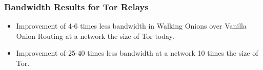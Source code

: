 \documentclass[hyperref={pdfpagelabels=true},table,dvipsnames,14pt,aspectratio=169]{beamer}
\begin{document}
\begin{frame}
\frametitle{Bandwidth Results for Tor Relays}
\begin{center}
  \hspace{-1.7cm}
  \begin{minipage}[t] {0.45\linewidth}
    \vspace*{8em}
  \end{minipage}
  \hspace{0.6cm}
  \begin{minipage}[t] {0.45\linewidth}
    \vspace*{8em}
  \end{minipage}
\end{center}

  \footnotesize
  \begin{itemize}
    \item<2-> Improvement of 4-6 times less bandwidth in Walking Onions over
      Vanilla Onion Routing at a network the size of Tor today.
    \item<3> Improvement of 25-40 times less bandwidth at a network 10 times
      the size of Tor.
  \end{itemize}
\end{frame}
\end{document}
